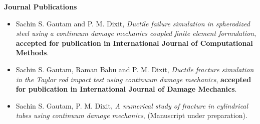 \begin {center}
\textbf{\Large Journal Publications}
\end{center}
\begin{itemize}
    \item Sachin S. Gautam and P. M. Dixit, \emph{Ductile failure simulation
    in spherodized steel using a continuum damage mechanics coupled finite element formulation},
     \textbf{accepted for publication in International Journal of Computational Methods}.

    \item Sachin S. Gautam, Raman Babu and P. M. Dixit, \emph{Ductile fracture
    simulation in the Taylor rod impact test using continuum damage mechanics},
    \textbf{accepted for publication in International Journal of Damage Mechanics}.

    \item Sachin S. Gautam, P. M. Dixit, \emph{A numerical study of fracture
    in cylindrical tubes using continuum damage mechanics}, (Manuscript under preparation).

\end{itemize}

